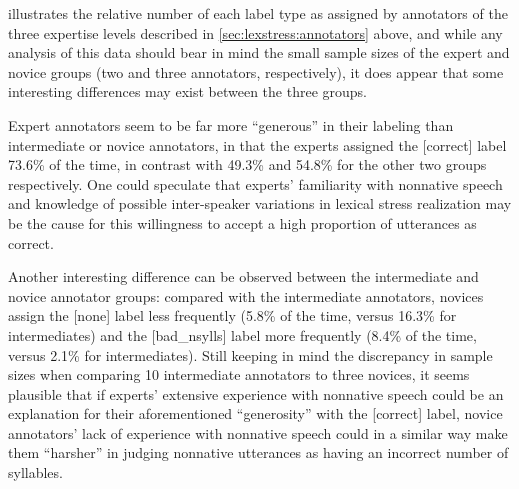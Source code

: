 		
%	
%			
%			
%			
		
			 illustrates the relative number of each label type as assigned by annotators of the three expertise levels described in \cref{sec:lexstress:annotators} above, and while any analysis of this data should bear in mind the small sample sizes of the expert and novice groups (two and three annotators, respectively), it does appear that some interesting differences may exist between the three groups. 
			
			Expert annotators seem to be far more ``generous'' in their labeling than intermediate or novice annotators, in that the experts assigned the [correct] label 73.6\% of the time, in contrast with 49.3\% and 54.8\% for the other two groups respectively. One could speculate that experts' familiarity with nonnative speech and knowledge of possible inter-speaker variations in lexical stress realization may be the cause for this willingness to accept a high proportion of utterances as correct. 
			
			Another interesting difference can be observed between the intermediate and novice annotator groups: compared with the intermediate annotators, novices assign the [none] label less frequently (5.8\% of the time, versus 16.3\% for intermediates) and the [bad\_nsylls] label more frequently (8.4\% of the time, versus 2.1\% for intermediates). Still keeping in mind the discrepancy in sample sizes when comparing 10 intermediate annotators to three novices, 
			it seems plausible that if experts' extensive experience with nonnative speech could be an explanation for their aforementioned ``generosity'' with the [correct] label, novice annotators' lack of experience with nonnative speech could in a similar way make them ``harsher'' in judging nonnative utterances as having an incorrect number of syllables. 
			
